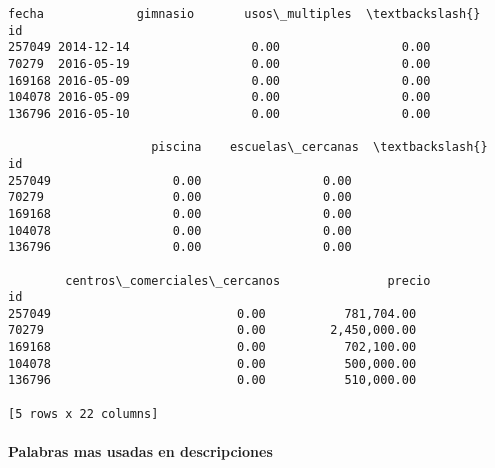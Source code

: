 \documentclass[11pt]{article}
\begin{document}
\begin{tcolorbox}[breakable, boxrule=.5pt, size=fbox, pad at break*=1mm, opacityfill=0]
\begin{Verbatim}[commandchars=\\\{\}]
            fecha             gimnasio       usos\_multiples  \textbackslash{}
id
257049 2014-12-14                 0.00                 0.00
70279  2016-05-19                 0.00                 0.00
169168 2016-05-09                 0.00                 0.00
104078 2016-05-09                 0.00                 0.00
136796 2016-05-10                 0.00                 0.00

                    piscina    escuelas\_cercanas  \textbackslash{}
id
257049                 0.00                 0.00
70279                  0.00                 0.00
169168                 0.00                 0.00
104078                 0.00                 0.00
136796                 0.00                 0.00

        centros\_comerciales\_cercanos               precio
id
257049                          0.00           781,704.00
70279                           0.00         2,450,000.00
169168                          0.00           702,100.00
104078                          0.00           500,000.00
136796                          0.00           510,000.00

[5 rows x 22 columns]
\end{Verbatim}
\end{tcolorbox}
        
    \paragraph{Palabras mas usadas en
descripciones}\label{palabras-mas-usadas-en-descripciones}
\end{document}
